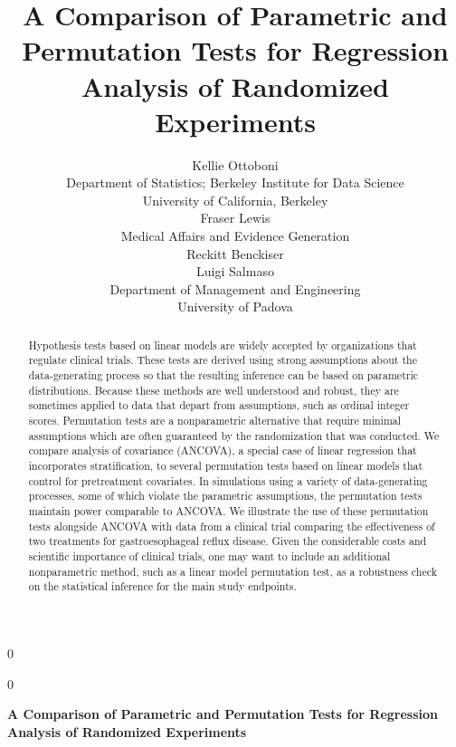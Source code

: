 \documentclass[12pt]{article}
\newcommand{\blind}{0}
\begin{document}
%

\def\spacingset#1{\renewcommand{\baselinestretch}%
{#1}\small\normalsize} \spacingset{1}



\blind
{
  \title{\bf A Comparison of Parametric and Permutation Tests for Regression Analysis of Randomized Experiments}
\author{Kellie Ottoboni \\
Department of Statistics; Berkeley Institute for Data Science\\
University of California, Berkeley \\ [.1in]
Fraser Lewis \\
Medical Affairs and Evidence Generation \\
Reckitt Benckiser\\  [.1in]
Luigi Salmaso\\
Department of Management and Engineering \\
University of Padova
}  \maketitle
} \fi

\blind
{
  \bigskip
  \bigskip
  \bigskip
  \begin{center}
    {\LARGE\bf  A Comparison of Parametric and Permutation Tests for Regression Analysis of Randomized Experiments}
\end{center}
  \medskip
} \fi

\bigskip
\begin{abstract}
Hypothesis tests based on linear models are widely accepted by organizations that regulate clinical trials.
These tests are derived using strong assumptions about the data-generating process so that the resulting inference can be based on parametric distributions.
Because these methods are well understood and robust, they are sometimes applied to data that depart from assumptions, such as ordinal integer scores.
Permutation tests are a nonparametric alternative that require minimal assumptions which are often guaranteed by the randomization that was conducted.
We compare analysis of covariance (ANCOVA), a special case of linear regression that incorporates stratification, to several permutation tests based on linear models that control for pretreatment covariates.
In simulations using a variety of data-generating processes, some of which violate the parametric assumptions,
the permutation tests maintain power comparable to ANCOVA.
We illustrate the use of these permutation tests alongside ANCOVA with data from a clinical trial comparing the effectiveness of two treatments for gastroesophageal reflux disease.
Given the considerable costs and scientific importance of clinical trials, one may want to include an additional nonparametric method, such as a linear model permutation test, as a robustness check on the statistical inference for the main study endpoints.
\end{abstract}
\end{document}
